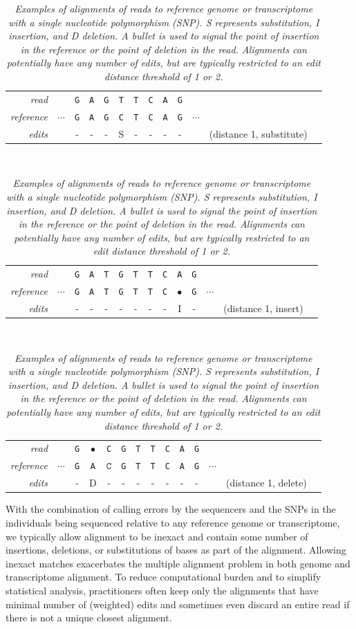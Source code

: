 \documentclass[11pt]{report}
\newcommand{\mybase}[1]{\texttt{#1}\xspace}
\newcommand{\baseA}{\mybase{A}}
\newcommand{\baseC}{\mybase{C}}
\newcommand{\baseG}{\mybase{G}}
\newcommand{\baseT}{\mybase{T}}
\newcommand{\mycaption}[2]{\caption{\small\it #2}\label{#1}}
\begin{document}
\begin{table}[t!]
  \centering\small
  \begin{tabular}{r|cccccccccccl}
    \textit{read} & & \baseG & \baseA & \baseG & \baseT & \baseT & \baseC & \baseA & \baseG
    \\
    \textit{reference} & $\cdots$ & \baseG & \baseA & \baseG & \baseC & \baseT & \baseC & \baseA & \baseG & $\cdots$
    \\ \hline
    \textit{edits} &  & - & - & - & \small S & - & - & - & - &  & \small (distance 1, substitute)
  \end{tabular}
  \\[12pt]
  \begin{tabular}{r|ccccccccccccl}
    \textit{read} & & \baseG & \baseA &\baseT & \baseG & \baseT & \baseT & \baseC & \baseA & \baseG &
    \\
    \textit{reference} & $\cdots$ & \baseG & \baseA & \baseT & \baseG & \baseT & \baseT & \baseC & $\bullet$ & \baseG & $\cdots$
    \\ \hline
    \textit{edits} & & - & - & - & - & - & - & - & \small I & - & & \small (distance 1, insert)
  \end{tabular}
  \\[12pt]
  \begin{tabular}{r|ccccccccccccl}
    \textit{read} & & \baseG & $\bullet$ & \baseC & \baseG & \baseT & \baseT & \baseC & \baseA & \baseG &
    \\
    \textit{reference} & $\cdots$ & \baseG & \baseA & $\baseC$ & \baseG & \baseT & \baseT & \baseC & \baseA & \baseG & $\cdots$
    \\ \hline
    \textit{edits} & & - & \small D & - & - & - & - & - & - & - & & \small (distance 1, delete)
  \end{tabular}
  \mycaption{tab:edit-distance}{Examples of alignments of reads to
    reference genome or transcriptome with a single nucleotide
    polymorphism (SNP). S represents substitution, I insertion, and D
    deletion. A bullet is used to signal the point of insertion in the
    reference or the point of deletion in the read. Alignments can
    potentially have any number of edits, but are typically restricted
    to an edit distance threshold of 1 or 2.}
\end{table}

With the combination of calling errors by the sequencers and the SNPs
in the individuals being sequenced relative to any reference genome or
transcriptome, we typically allow alignment to be inexact and contain
some number of insertions, deletions, or substitutions of bases as
part of the alignment. Allowing inexact matches exacerbates the
multiple alignment problem in both genome and transcriptome alignment.
To reduce computational burden and to simplify statistical analysis,
practitioners often keep only the alignments that have minimal number
of (weighted) edits and sometimes even discard an entire read if there
is not a unique closest alignment.
\end{document}
